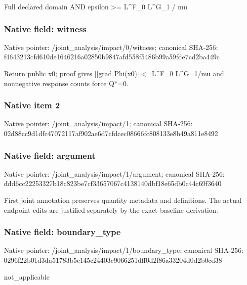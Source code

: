 \documentclass[10pt,a4paper]{article}
\begin{document}
\begingroup\raggedright\sloppy Full declared domain AND epsilon >=\allowbreak{} L\textasciicircum{}F\_\allowbreak{}0 L\textasciicircum{}G\_\allowbreak{}1 /\allowbreak{} mu\par\endgroup

\subsubsection{Native field: witness}
Native pointer: /joint\_\allowbreak{}analysis/impact/0/witness; canonical SHA-256: f4643213cfd610de1646216a02850b9847afd558f5486b99a59fde7cd2ba449c

\begingroup\raggedright\sloppy Return public x0;\allowbreak{} proof gives ||grad Phi(x0)||<=\allowbreak{}L\textasciicircum{}F\_\allowbreak{}0 L\textasciicircum{}G\_\allowbreak{}1/\allowbreak{}mu and nonnegative response counts force Q*=\allowbreak{}0.\par\endgroup

\subsubsection{Native item 2}
Native pointer: /joint\_\allowbreak{}analysis/impact/1; canonical SHA-256: 02d88cc9d1dfc47072117af902ae6d7cfdcec08666fc808133e8b49a811e8492

\subsubsection{Native field: argument}
Native pointer: /joint\_\allowbreak{}analysis/impact/1/argument; canonical SHA-256: ddd6cc22253327b18c823be7cf33657067c4138140dbf18e65db0c44c69f3640

\begingroup\raggedright\sloppy First joint annotation preserves quantity metadata and definitions. The actual endpoint edits are justified separately by the exact baseline derivation.\par\endgroup

\subsubsection{Native field: boundary\_\allowbreak{}type}
Native pointer: /joint\_\allowbreak{}analysis/impact/1/boundary\_\allowbreak{}type; canonical SHA-256: 0296f22b01d3da51783b5e145c24403c9066251dff0d2f86a33204d0d2b0cd38

\begingroup\raggedright\sloppy not\_\allowbreak{}applicable\par\endgroup
\end{document}
